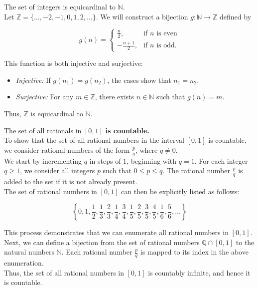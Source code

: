 \begin{example}
    The set of integers is equicardinal to $\mathbb{N}$. \\

    Let \( \mathbb{Z} = \{ \ldots, -2, -1, 0, 1, 2, \ldots \} \). We will construct a bijection \( g: \mathbb{N} \to \mathbb{Z} \) defined by

\[
g(n) = \begin{cases}
\frac{n}{2}, & \text{if } n \text{ is even} \\
-\frac{n+1}{2}, & \text{if } n \text{ is odd}.
\end{cases}
\]

This function is both injective and surjective:

\begin{itemize}
    \item \textit{Injective:} If \( g(n_1) = g(n_2) \), the cases show that \( n_1 = n_2 \).
    \item \textit{Surjective:} For any \( m \in \mathbb{Z} \), there exists \( n \in \mathbb{N} \) such that \( g(n) = m \).
\end{itemize}

Thus, \( \mathbb{Z} \) is equicardinal to \( \mathbb{N} \).
\end{example}

\begin{example}
    The set of all rationals in  $[0, 1]$ \textbf{ is countable.} \\

    To show that the set of all rational numbers in the interval $[0, 1]$ is countable, we consider rational numbers of the form $\frac{p}{q}$, where $q \neq 0$. \\

We start by incrementing $q$ in steps of 1, beginning with $q = 1$. For each integer $q \geq 1$, we consider all integers $p$ such that $0 \leq p \leq q$. The rational number $\frac{p}{q}$ is added to the set if it is not already present. \\

The set of rational numbers in $[0, 1]$ can then be explicitly listed as follows:

\[
\left\{ 0, 1, \frac{1}{2}, \frac{1}{3}, \frac{2}{3}, \frac{1}{4}, \frac{3}{4}, \frac{1}{5}, \frac{2}{5}, \frac{3}{5}, \frac{4}{5}, \frac{1}{6}, \frac{5}{6}, \ldots \right\}
\]

This process demonstrates that we can enumerate all rational numbers in $[0, 1]$. \\ 

Next, we can define a bijection from the set of rational numbers $\mathbb{Q} \cap [0, 1]$ to the natural numbers $\mathbb{N}$. Each rational number $\frac{p}{q}$ is mapped to its index in the above enumeration.\\

Thus, the set of all rational numbers in $[0, 1]$ is countably infinite, and hence it is countable.
\end{example}

